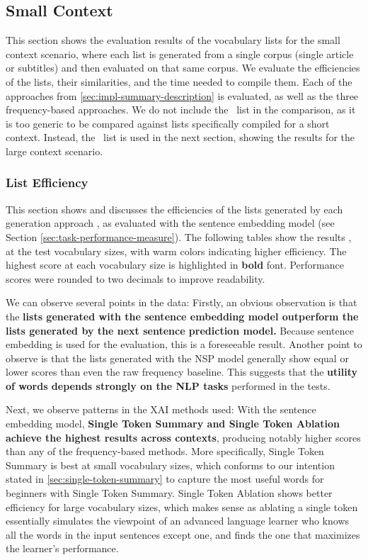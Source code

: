 \subsection{Small Context} \label{sec:results-small-context}
This section shows the evaluation results of the vocabulary lists for the small context scenario, where each list is generated from a single corpus (single article or subtitles) and then evaluated on that same corpus.
We evaluate the efficiencies of the lists, their similarities, and the time needed to compile them.
Each of the approaches from \ref{sec:impl-summary-description} is evaluated, as well as the three frequency-based approaches.
We do not include the \Rosetta\ list in the comparison, as it is too generic to be compared against lists specifically compiled for a short context.
Instead, the \Rosetta\ list is used in the next section, showing the results for the large context scenario.


\subsubsection{List Efficiency}
This section shows and discusses the efficiencies of the lists generated by each generation approach , as evaluated with the sentence embedding model (see Section \ref{sec:task-performance-measure}).
The following tables show the results , at the test vocabulary sizes, with warm colors indicating higher efficiency.
The highest score at each vocabulary size is highlighted in \textbf{bold} font.
Performance scores were rounded to two decimals to improve readability.



We can observe several points in the data:
Firstly, an obvious observation is that the \textbf{lists generated with the sentence embedding model outperform the lists generated by the next sentence prediction model.}
Because sentence embedding is used for the evaluation, this is a foreseeable result.
Another point to observe is that the lists generated with the NSP model generally show equal or lower scores than even the raw frequency baseline.
This suggests that the \textbf{utility of words depends strongly on the NLP tasks} performed in the tests.

Next, we observe patterns in the XAI methods used:
With the sentence embedding model, \textbf{Single Token Summary and Single Token Ablation achieve the highest results across contexts}, producing notably higher scores than any of the frequency-based methods.
More specifically, Single Token Summary is best at small vocabulary sizes, which conforms to our intention stated in \ref{sec:single-token-summary} to capture the most useful words for beginners with Single Token Summary.
Single Token Ablation shows better efficiency for large vocabulary sizes, which makes sense as ablating a single token essentially simulates the viewpoint of an advanced language learner who knows all the words in the input sentences except one, and finds the one that maximizes the learner's performance.

